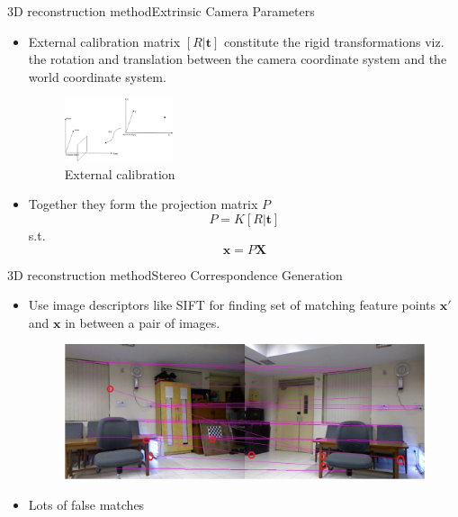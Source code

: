 \documentclass{beamer}
\begin{document}
\begin{frame}{3D reconstruction method}{Extrinsic Camera Parameters}
 \begin{itemize}
  \item External calibration matrix $[R|\textbf{t}]$ constitute the rigid transformations viz. the rotation and translation between the camera coordinate system and the world coordinate system.
  \begin{figure}
    \centering
    \includegraphics[width=0.3\textwidth]{CameraWorld.png}
    \caption{External calibration}
  \end{figure}
  \item Together they form the projection matrix $P$
  \begin{equation*}
    P = K[R|\textbf{t}]
    \end{equation*}
    s.t. \begin{equation*} \mathbf{x} = P\mathbf{X} \end{equation*}
  \end{itemize}
  \note{\textcolor{red}{Kartikeya\\}}
\end{frame}

\begin{frame}{3D reconstruction method}{Stereo Correspondence Generation}
  \begin{itemize}
    \item Use image descriptors like SIFT for finding set of matching feature points $\mathbf{x}'$ and $\mathbf{x}$ in between a pair of images.
  \begin{figure}[ht!]
    \centering
    \includegraphics[width=\linewidth]{siftcorres.jpg}
  \end{figure}
    \item Lots of false matches
  \end{itemize}
  \note{\textcolor{red}{Kartikeya\\}}
\end{frame}
\end{document}
